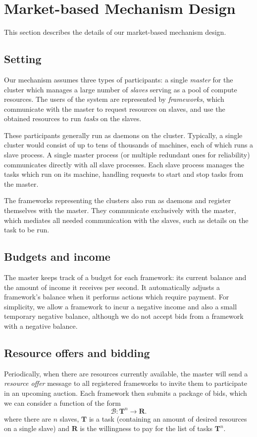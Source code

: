 \documentclass{acm_proc_article-sp}
\begin{document}
\section{Market-based Mechanism Design}

This section describes the details of our market-based mechanism design.

\label{sec:design}
\subsection{Setting}
Our mechanism assumes three types of participants: a single \emph{master} for
the cluster which manages a large number of \emph{slaves} serving as a pool of
compute resources. The users of the system are represented by \emph{frameworks},
which communicate with the master to request resources on slaves, and use the
obtained resources to run \emph{tasks} on the slaves.

These participants generally run as daemons on the cluster.  Typically, a single
cluster would consist of up to tens of thousands of machines, each of which
runs a slave process. A single master process (or multiple redundant ones
for reliability) communicates directly with all slave processes.  Each slave
process manages the tasks which run on its machine, handling requests to start
and stop tasks from the master.

The frameworks representing the clusters also run as daemons and register
themselves with the master. They communicate exclusively with the master, which
mediates all needed communication with the slaves, such as details on the task
to be run.

\subsection{Budgets and income}
The master keeps track of a budget for each framework: its current balance and
the amount of income it receives per second. It automatically adjusts a
framework's balance when it performs actions which require payment. For simplicity,
we allow a framework to incur a negative income and also a small temporary negative balance, although we do not accept bids from a framework with a negative balance.

\subsection{Resource offers and bidding}
Periodically, when there are resources currently available, the master will
send a \emph{resource offer} message to all registered frameworks to invite them
to participate in an upcoming auction. Each framework then submits a package of
bids, which we can consider a function of the form
\[ \mathcal{B}: \mathbf{T}^n \rightarrow \mathbf{R}. \]
where there are $n$ slaves, $\mathbf{T}$ is a task (containing an amount of desired
resources on a single slave) and $\mathbf{R}$ is the willingness to pay for the
list of tasks $\mathbf{T}^n$.
\end{document}
